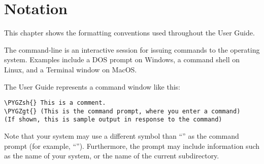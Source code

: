 \documentclass[letterpaper,10pt,english]{sphinxmanual}
\def\PYGZgt{\char`\>}
\def\PYGZsh{\char`\#}
\begin{document}
\chapter{Notation}
\label{notation::doc}\label{notation:notation}\label{notation:id1}
This chapter shows the formatting conventions used throughout the User Guide.

The command-line is an interactive session for issuing commands to the operating system.
Examples include a DOS prompt on Windows, a command shell on Linux, and a Terminal window on MacOS.

The User Guide represents a command window like this:

\begin{Verbatim}[commandchars=\\\{\}]
\PYGZsh{} This is a comment.
\PYGZgt{} (This is the command prompt, where you enter a command)
(If shown, this is sample output in response to the command)
\end{Verbatim}

Note that your system may use a different symbol than ``\code{\textgreater{}}'' as the command prompt (for example, ``\code{\$}'').
Furthermore, the prompt may include information such as the name of your system, or the name of the current subdirectory.
\end{document}
